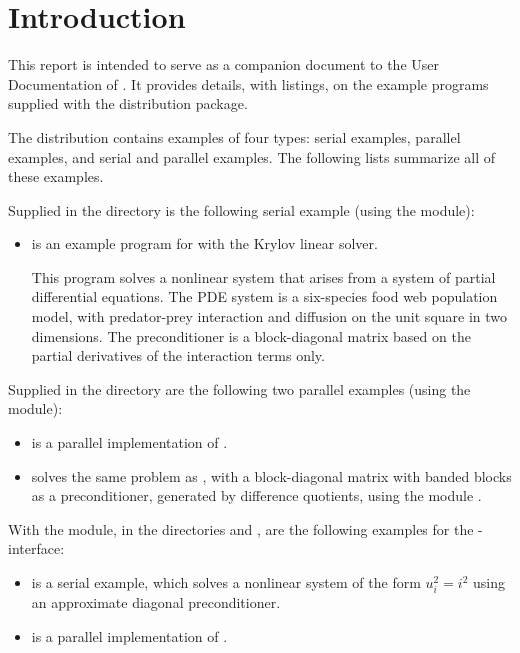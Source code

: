 \section{Introduction}\label{s:ex_intro}

This report is intended to serve as a companion document to the User
Documentation of {\kinsol} \cite{kinsol2.2.0_ug}.  It provides details, with
listings, on the example programs supplied with the {\kinsol} distribution
package.

The {\kinsol} distribution contains examples of four types: serial
{\C} examples, parallel {\C} examples, and serial and parallel {\F}
examples.  The following lists summarize all of these examples.

Supplied in the  directory is the
following serial example (using the {\nvecs} module):

\begin{itemize}
\item {}
  is an example program for {\kinsol} with the Krylov linear solver.

  This program solves a nonlinear system that arises from a system
  of partial differential equations.  The PDE system is a six-species
  food web population model, with predator-prey interaction and diffusion
  on the unit square in two dimensions.
  The preconditioner is a block-diagonal matrix based on
  the partial derivatives of the interaction terms only.
\end{itemize}
Supplied in the  directory are
the following two parallel examples (using the {\nvecp} module):
\begin{itemize}
\item {}
  is a parallel implementation of .
\item {}
  solves the same problem as , with a block-diagonal matrix
  with banded blocks as a preconditioner, generated by difference quotients,
  using the module {\kinbbdpre}.
\end{itemize}
With the {\fkinsol} module, in the directories 
 and
, are the following examples for
the {\F}-{\C} interface:
\begin{itemize}
\item {}
  is a serial example, which solves a nonlinear system of the form
  $u_i^2 = i^2$ using an approximate diagonal preconditioner.
\item {}
  is a parallel implementation of .
\end{itemize}


